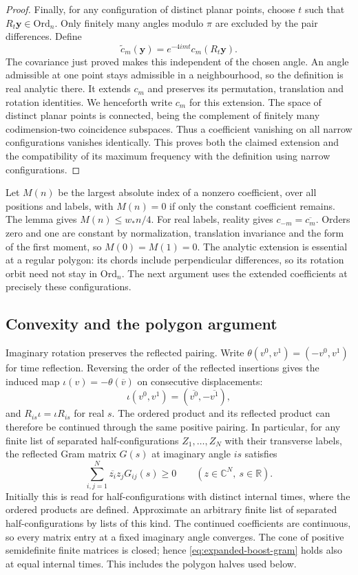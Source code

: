 \documentclass[11pt,letterpaper,reqno]{amsart}
\theoremstyle{definition}
\theoremstyle{remark}
\begin{document}
\begin{proof}
Finally, for any configuration of distinct planar points, choose
$t$ such that $R_t\mathbf y\in\mathrm{Ord}_n$. Only finitely many
angles modulo $\pi$ are excluded by the pair differences. Define
\[
 \widetilde c_m(\mathbf y)
       =e^{-4imt}c_m(R_t\mathbf y).
\]
The covariance just proved makes this independent of the chosen
angle. An angle admissible at one point stays admissible in a
neighbourhood, so the definition is real analytic there. It extends
$c_m$ and preserves its permutation, translation and rotation
identities. We henceforth write $c_m$ for this extension. The space
of distinct planar points is connected, being the complement of
finitely many codimension-two coincidence subspaces. Thus a
coefficient vanishing on all narrow configurations vanishes
identically. This proves both the claimed extension and the
compatibility of its maximum frequency with the definition using
narrow configurations.
\end{proof}

Let $M(n)$ be the largest absolute index of a nonzero coefficient,
over all positions and labels, with $M(n)=0$ if only the constant
coefficient remains. The lemma gives $M(n)\le w_*n/4$. For real
labels, reality gives $c_{-m}=\overline{c_m}$. Orders zero and one
are constant by normalization, translation invariance and the form
of the first moment, so $M(0)=M(1)=0$. The analytic extension
is essential at a regular polygon: its chords include perpendicular
differences, so its rotation orbit need not stay in
$\mathrm{Ord}_n$. The next argument uses the extended coefficients
at precisely these configurations.

\subsection{Convexity and the polygon argument}

Imaginary rotation preserves the reflected pairing. Write
$\theta(v^0,v^1)=(-v^0,v^1)$ for time reflection. Reversing the
order of the reflected insertions gives the induced map
$\iota(v)=-\theta(\overline v)$ on consecutive displacements:
\[
 \iota(v^0,v^1)=(\overline{v^0},-\overline{v^1}),
\]
and $R_{is}\iota=\iota R_{is}$ for real $s$. The ordered product and
its reflected product can therefore be continued through the same
positive pairing. In particular, for any finite list of separated
half-configurations $Z_1,\ldots,Z_N$ with their transverse labels,
the reflected Gram matrix $G(s)$ at imaginary angle $is$ satisfies
\begin{equation}\label{eq:expanded-boost-gram}
 \sum_{i,j=1}^N\overline{z_i}z_jG_{ij}(s)\ge0
 \qquad(z\in\mathbb C^N,\ s\in\mathbb R).
\end{equation}
Initially this is read for half-configurations with distinct internal
times, where the ordered products are defined. Approximate an arbitrary
finite list of separated half-configurations by lists of this kind.
The continued coefficients are continuous, so every matrix entry at a
fixed imaginary angle converges. The cone of positive semidefinite
finite matrices is closed; hence \eqref{eq:expanded-boost-gram}
holds also at equal internal times. This includes the polygon halves
used below.
\end{document}
